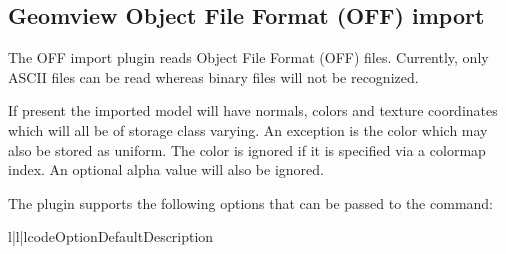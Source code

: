 
\subsection{Geomview Object File Format (OFF) import}

The OFF import plugin reads  
Object File Format (OFF) files. Currently, only ASCII files can be read
whereas binary files will not be recognized.

If present the imported model will have normals, colors and texture
coordinates which will all be of storage class {\var varying}. An exception
is the color which may also be stored as {\var uniform}. The color is ignored
if it is specified via a colormap index. An optional alpha value will
also be ignored.

The plugin supports the following options that can be passed to
the  command:

\begin{tableiii}{l|l|l}{code}{Option}{Default}{Description}
\end{tableiii}

